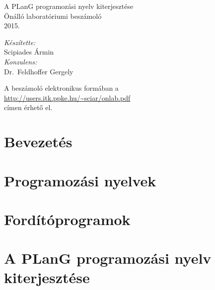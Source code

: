 \documentclass[twoside,11pt,a4paper]{article}
\theoremstyle{plain}
\begin{document}
\pagestyle{empty}
\begin{titlepage}
\newlength\drop
\setlength\drop{0.08\textheight}

\centering
\vspace*{2\drop}

{\huge A PLanG programozási nyelv kiterjesztése}\\[\baselineskip]
{Önálló laboratóriumi beszámoló}\\[\baselineskip]

\vspace*{0.5\drop}
\large 2015.

\vfill
\begin{flushright} \large
\emph{Készítette:}\\
Scipiades Ármin\\[\baselineskip]
\emph{Konzulens:} \\
Dr.~Feldhoffer Gergely
\end{flushright}
\vspace*{\drop}

\end{titlepage}
\newpage

\vspace*{\fill}
\begin{center}
A beszámoló elektronikus formában a\\
\url{http://users.itk.ppke.hu/~sciar/onlab.pdf}\\
címen érhető el.
\end{center}

\cleardoublepage
%
\tableofcontents

\newpage
\setcounter{page}{1}
\pagestyle{plain}
\section{Bevezetés}
\label{sec:intro}


\newpage
\section{Programozási nyelvek}
\label{sec:proglang}


\newpage
\section{Fordítóprogramok}
\label{sec:fordprog}


\newpage
\section{A PLanG programozási nyelv kiterjesztése}
\label{sec:xplang}



\newpage
\printbibliography[heading=bibintoc]
\end{document}
